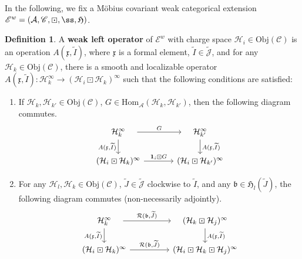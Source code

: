 \documentclass[11pt,b5paper,notitlepage]{article}
\theoremstyle{definition}
\newtheorem{df}{Definition}[section]
\theoremstyle{plain}
\newcommand{\fk}{\mathfrak}
\newcommand{\mc}{\mathcal}
\newcommand{\wtd}{\widetilde}
\newcommand{\idt}{\mathbf{1}}
\newcommand{\Hom}{\mathrm{Hom}}
\newcommand{\scr}{\mathscr}
\newcommand{\Jtd}{\widetilde{\mathcal J}}
\newcommand{\xk}{\mathfrak x}
\newcommand{\Obj}{\mathrm{Obj}}
\numberwithin{equation}{section}
\begin{document}
In the following, we fix a M\"obius covariant weak categorical extension $\scr E^w=(\mc A,\scr C,\boxdot,\ss,\fk H)$.

\begin{df}\label{lb9}
A \textbf{weak left operator} of $\scr E^w$ with charge space $\mc H_i\in\Obj(\scr C)$ is an operation $A(\fk x,\wtd I)$, where $\fk x$ is a formal element, $\wtd I\in\Jtd$, and for any $\mc H_k\in\Obj(\scr C)$, there is a smooth and localizable operator $A(\fk x,\wtd I):\mc H_k^\infty\rightarrow(\mc H_i\boxdot\mc H_k)^\infty$ such that the following conditions are satisfied:
\begin{enumerate}[label=(\alph*)]
\item If $\mc H_k,\mc H_{k'}\in\Obj(\scr C)$, $G\in\Hom_{\mc A}(\mc H_k,\mc H_{k'})$, then  the following diagram commutes.
\begin{equation}
\begin{tikzcd}[column sep=large]
\quad\mc H_k^\infty\quad \arrow[d,"{A(\xk,\wtd I)}"'] \arrow[r,"G"] & \quad\mc H_{k'}^\infty\quad \arrow[d,"{A(\xk,\wtd I)}"] \\
(\mc H_i\boxdot\mc H_k)^\infty \arrow[r,"\idt_i\boxdot G"]           & (\mc H_i\boxdot\mc H_{k'})^\infty          
\end{tikzcd}
\end{equation}
\item For any $\mc H_l,\mc H_k\in\Obj(\scr C)$,  $\wtd J\in\Jtd$  clockwise to $\wtd I$, and any $\fk b\in\fk H_l(\wtd J)$, the following diagram  commutes (non-necessarily adjointly).
\begin{equation}
\begin{tikzcd}[column sep=huge]
\quad \mc H_k^\infty\quad \arrow[r,"{\mc R(\fk b,\wtd J)}"] \arrow[d, "{A(\xk,\wtd I)}"'] &\quad (\mc H_k\boxdot\mc H_j)^\infty\quad \arrow[d, "{A(\xk,\wtd I)}"]\\
(\mc H_i\boxdot\mc H_k)^\infty\arrow[r,"{\mc R(\fk b,\wtd J)}"] &(\mc H_i\boxdot\mc H_k\boxdot\mc H_j)^\infty
\end{tikzcd}
\end{equation}
\end{enumerate}
\end{df}
\end{document}
